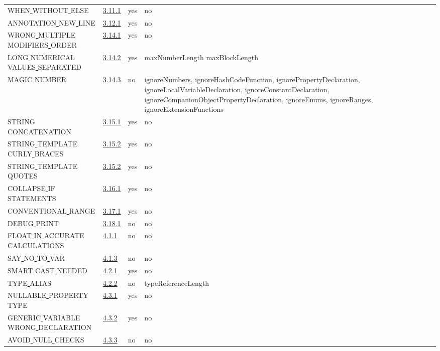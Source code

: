 \begin{longtable}{ |l|p{0.8cm}|p{0.8cm}| p{3cm} | }
WHEN\underline{ }WITHOUT\underline{ }ELSE & \hyperref[sec:3.11.1]{3.11.1} &  yes  &   no  \\
ANNOTATION\underline{ }NEW\underline{ }LINE & \hyperref[sec:3.12.1]{3.12.1} &  yes  &   no  \\
WRONG\underline{ }MULTIPLE\underline{ }MODIFIERS\underline{ }ORDER & \hyperref[sec:3.14.1]{3.14.1} &  yes  &   no  \\
LONG\underline{ }NUMERICAL\underline{ }VALUES\underline{ }SEPARATED & \hyperref[sec:3.14.2]{3.14.2} &  yes  &   maxNumberLength maxBlockLength \\
MAGIC\underline{ }NUMBER & \hyperref[sec:3.14.3]{3.14.3} &  no  &  ignoreNumbers, ignoreHashCodeFunction, ignorePropertyDeclaration, ignoreLocalVariableDeclaration, ignoreConstantDeclaration, ignoreCompanionObjectPropertyDeclaration, ignoreEnums, ignoreRanges, ignoreExtensionFunctions \\
STRING\underline{ }CONCATENATION & \hyperref[sec:3.15.1]{3.15.1} &  yes  &   no  \\
STRING\underline{ }TEMPLATE\underline{ }CURLY\underline{ }BRACES & \hyperref[sec:3.15.2]{3.15.2} &  yes  &   no  \\
STRING\underline{ }TEMPLATE\underline{ }QUOTES & \hyperref[sec:3.15.2]{3.15.2} &  yes  &   no  \\
COLLAPSE\underline{ }IF\underline{ }STATEMENTS & \hyperref[sec:3.16.1]{3.16.1} &  yes  &   no    \\
CONVENTIONAL\underline{ }RANGE & \hyperref[sec:3.17.1]{3.17.1} &  yes  &   no    \\
DEBUG\underline{ }PRINT & \hyperref[sec:3.18.1]{3.18.1} &  no  &  no \\
FLOAT\underline{ }IN\underline{ }ACCURATE\underline{ }CALCULATIONS & \hyperref[sec:4.1.1]{4.1.1} &  no  &   no  \\
SAY\underline{ }NO\underline{ }TO\underline{ }VAR & \hyperref[sec:4.1.3]{4.1.3} &  no  &   no  \\
SMART\underline{ }CAST\underline{ }NEEDED & \hyperref[sec:4.2.1]{4.2.1} &  yes  &   no  \\
TYPE\underline{ }ALIAS & \hyperref[sec:4.2.2]{4.2.2} &  no  &   typeReferenceLength        \\
NULLABLE\underline{ }PROPERTY\underline{ }TYPE & \hyperref[sec:4.3.1]{4.3.1} &  yes  &   no  \\
GENERIC\underline{ }VARIABLE\underline{ }WRONG\underline{ }DECLARATION & \hyperref[sec:4.3.2]{4.3.2} &  yes  &   no  \\
AVOID\underline{ }NULL\underline{ }CHECKS & \hyperref[sec:4.3.3]{4.3.3} &  no  &   no  \\

\end{longtable}
